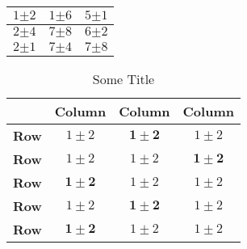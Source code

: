\documentclass{article}
\begin{document}
\begin{center}


\begin{tabular}
{ |c|c|c| }
\hline 
$1{\scriptstyle \pm 2}$ & $1{\scriptstyle \pm 6}$ & $5{\scriptstyle \pm 1}$ \\ \hline
$2{\scriptstyle \pm 4}$ & $7{\scriptstyle \pm 8}$ & $6{\scriptstyle \pm 2}$ \\ \hline
$2{\scriptstyle \pm 1}$ & $7{\scriptstyle \pm 4}$ & $7{\scriptstyle \pm 8}$ \\ \hline
\end{tabular}
\end{center}

\begin{table}[ht]
\centering %
\begin{tabular}{|c|c|c|c|} %

\hline
 & \textbf{Column} & \textbf{Column} & \textbf{Column} \\ [0.1ex] %


\hline
\textbf{Row} & $1 \pm 2$ & $\mathbf{1 \pm 2}$ & $1 \pm 2$ \\ 
\hline
\textbf{Row} & $1 \pm 2$ & $1 \pm 2$ & $\mathbf{1 \pm 2}$ \\
\hline
\textbf{Row} & $\mathbf{1 \pm 2}$ & $1 \pm 2$ & $1 \pm 2$ \\
\hline
\textbf{Row} & $1 \pm 2$ & $\mathbf{1 \pm 2}$ & $1 \pm 2$ \\
\hline
\textbf{Row} & $\mathbf{1 \pm 2}$ & $1 \pm 2$ & $1 \pm 2$ \\
\hline %
\end{tabular}
\label{table:nonlin} %
\\[-1.5ex]
\caption{Some Title}
\end{table}
		
\end{document}

